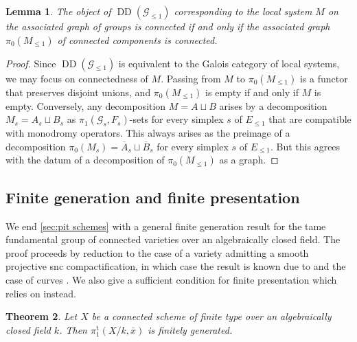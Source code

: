 \documentclass[a4paper,twoside,11pt,reqno]{amsart}
\newcommand{\cG}{{\mathcal G}}
\newcommand{\ov}[1]{\overline{#1}}
\newcommand{\pitame}{\pi_1^{\mathrm{t}}}
\DeclareMathOperator{\Desc}{DD}
\newtheorem{thm}{Theorem}[subsection]
\newtheorem{lem}[thm]{Lemma}
\theoremstyle{definition}
\numberwithin{equation}{subsection}
\begin{document}
\begin{lem} \label{lem:local-system-connected}
    The object of $\Desc(\cG_{\leq 1})$ corresponding to the local system $M$ on the associated graph of groups is connected if and only if the associated graph $\pi_0(M_{\leq 1})$ of connected components is connected.
\end{lem}

\begin{proof}
    Since $\Desc(\cG_{\leq 1})$ is equivalent to the Galois category of local systems, we may focus on connectedness of $M$. 
    Passing from $M$ to $\pi_0(M_{\leq 1})$ is a functor that preserves disjoint unions, and $\pi_0(M_{\leq 1})$ is empty if and only if $M$ is empty. Conversely, any decomposition $M = A \sqcup B$ arises by a decomposition $M_s = A_s \sqcup B_s$ as $\pi_1(\cG_s,F_s)$-sets for every simplex $s$ of $E_{\leq 1}$ that are compatible with monodromy operators.  
    This always arises as the preimage of a decomposition $\pi_0(M_s) = \ov{A}_s \sqcup \ov{B}_s$ for every simplex $s$ of $E_{\leq 1}$. 
    But this agrees with the datum of a decomposition of 
    $\pi_0(M_{\leq 1})$ as a graph.
\end{proof}


\subsection{Finite generation and finite presentation}

We end \cref{sec:pit schemes} with a general finite generation result for the tame fundamental group of connected varieties over an algebraically closed field. The proof proceeds by reduction to the case of a variety admitting a smooth projective snc compactification, in which case the result is known due to \cite[Theorem~1.1]{EsnaultKindler2016:LefschetzTheoremsTamely} and the case of curves \cite[XIII, Corollaire 2.12]{SGA1}.
We also give a sufficient condition for finite presentation which relies on \cite[Theorem~1.1]{EsnaultShustermanSrinivas2022:FinitePresentationTame} instead. 

\begin{thm} \label{thm:naked pi1tame fg}
    Let $X$ be a connected scheme of finite type over an algebraically closed field $k$. Then $\pitame(X/k,\bar x)$ is finitely generated. 
\end{thm}
\end{document}
